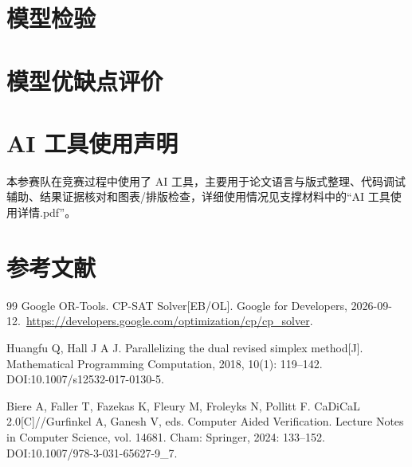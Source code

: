 \documentclass[UTF8,a4paper,zihao=-4]{ctexart}
\begin{document}
\section{模型检验}


\section{模型优缺点评价}


\section*{AI 工具使用声明}
本参赛队在竞赛过程中使用了 AI 工具，主要用于论文语言与版式整理、代码调试辅助、结果证据核对和图表/排版检查，详细使用情况见支撑材料中的“AI 工具使用详情.pdf”。

\clearpage
\section*{参考文献}
\renewcommand{\refname}{}
\begin{thebibliography}{99}
Google OR-Tools. CP-SAT Solver[EB/OL]. Google for Developers, 2026-09-12.\
\url{https://developers.google.com/optimization/cp/cp_solver}.

Huangfu Q, Hall J A J. Parallelizing the dual revised simplex method[J]. Mathematical Programming Computation, 2018, 10(1): 119--142. DOI:10.1007/s12532-017-0130-5.

Biere A, Faller T, Fazekas K, Fleury M, Froleyks N, Pollitt F. CaDiCaL 2.0[C]//Gurfinkel A, Ganesh V, eds. Computer Aided Verification. Lecture Notes in Computer Science, vol. 14681. Cham: Springer, 2024: 133--152. DOI:10.1007/978-3-031-65627-9\_7.
\end{thebibliography}

\clearpage
\end{document}
